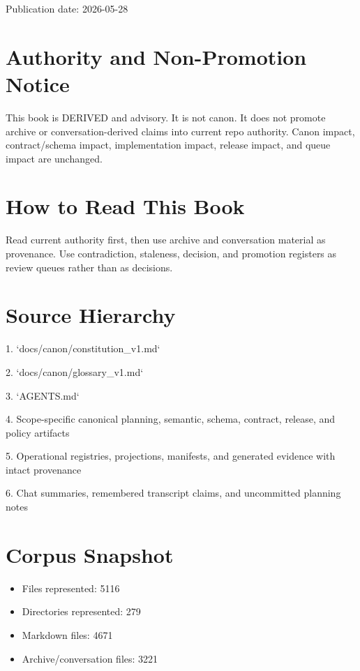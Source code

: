 \documentclass[11pt,a4paper]{report}
\begin{document}
Publication date: 2026-\allowbreak{}05-\allowbreak{}28


\section{Authority and Non-Promotion Notice}

This book is DERIVED and advisory.\allowbreak{} It is not canon.\allowbreak{} It does not promote archive or conversation-\allowbreak{}derived claims into current repo authority.\allowbreak{} Canon impact, contract/\allowbreak{}schema impact, implementation impact, release impact, and queue impact are unchanged.\allowbreak{}


\section{How to Read This Book}

Read current authority first, then use archive and conversation material as provenance.\allowbreak{} Use contradiction, staleness, decision, and promotion registers as review queues rather than as decisions.\allowbreak{}


\section{Source Hierarchy}

1.\allowbreak{} `docs/\allowbreak{}canon/\allowbreak{}constitution\_v1.\allowbreak{}md`

2.\allowbreak{} `docs/\allowbreak{}canon/\allowbreak{}glossary\_v1.\allowbreak{}md`

3.\allowbreak{} `AGENTS.\allowbreak{}md`

4.\allowbreak{} Scope-\allowbreak{}specific canonical planning, semantic, schema, contract, release, and policy artifacts

5.\allowbreak{} Operational registries, projections, manifests, and generated evidence with intact provenance

6.\allowbreak{} Chat summaries, remembered transcript claims, and uncommitted planning notes


\section{Corpus Snapshot}

\begin{itemize}
\item Files represented: 5116
\item Directories represented: 279
\item Markdown files: 4671
\item Archive/\allowbreak{}conversation files: 3221
\end{itemize}
\end{document}
